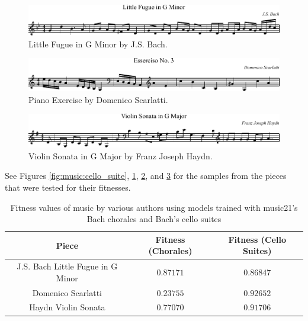 \begin{figure}[]
	\centering
	\includegraphics[width=\linewidth]{figures/little_fugue.pdf}
	\caption{Little Fugue in G Minor by J.S. Bach.}
	\label{fig:music:little_fugue}
\end{figure}

\begin{figure}[]
	\centering
	\includegraphics[width=\linewidth]{figures/scarlatti.pdf}
	\caption{Piano Exercise by Domenico Scarlatti.}
	\label{fig:music:scarlatti}
\end{figure}

\begin{figure}[]
	\centering
	\includegraphics[width=\linewidth]{figures/haydn.pdf}
	\caption{Violin Sonata in G Major by Franz Joseph Haydn.}
	\label{fig:music:haydn}
\end{figure}

See Figures \ref{fig:music:cello_suite}, \ref{fig:music:little_fugue}, \ref{fig:music:scarlatti}, and \ref{fig:music:haydn} for the samples from the pieces that were tested for their fitnesses.

\begin{table}[]
	\centering
	\begin{tabular}{c | c c}
		Piece & Fitness (Chorales) & Fitness (Cello Suites) \\
		\hline
		J.S. Bach Little Fugue in G Minor & $0.87171$ & $0.86847$ \\
		Domenico Scarlatti & $0.23755$ & $0.92652$ \\
		Haydn Violin Sonata & $0.77070$ & $0.91706$
	\end{tabular}
	\caption{Fitness values of music by various authors using models trained with music21's Bach chorales and Bach's cello suites}
	\label{table:fitnesscomp}
\end{table}

